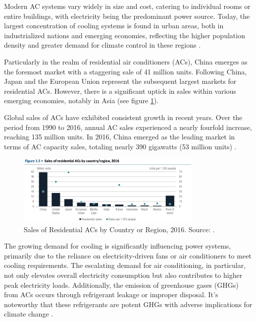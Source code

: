 Modern AC systems vary widely in size and cost, catering to individual rooms or entire buildings, with electricity being the predominant power source. Today, the largest concentration of cooling systems is found in urban areas, both in industrialized nations and emerging economies, reflecting the higher population density and greater demand for climate control in these regions \cite{international_energy_agency_future_2018}. 

Particularly in the realm of residential air conditioners (ACs), China emerges as the foremost market with a staggering sale of 41 million units. Following China, Japan and the European Union represent the subsequent largest markets for residential ACs. However, there is a significant uptick in sales within various emerging economies, notably in Asia (see figure \ref{fig:sales_acs}).

Global sales of ACs have exhibited consistent growth in recent years. Over the period from 1990 to 2016, annual AC sales experienced a nearly fourfold increase, reaching 135 million units. In 2016, China emerged as the leading market in terms of AC capacity sales, totaling nearly 390 gigawatts (53 million units) \cite{international_energy_agency_future_2018}.

\begin{figure}
  \centering
  \includegraphics[width=0.8\textwidth]{Chapters/Figures/Sales of Residential ACs by Country or Region, 2016.jpg}
  \caption[Sales of Residential ACs by Country or Region, 2016]{Sales of Residential ACs by Country or Region, 2016. Source: \cite{international_energy_agency_future_2018}.}
  \label{fig:sales_acs}
\end{figure}

The growing demand for cooling is significantly influencing power systems, primarily due to the reliance on electricity-driven fans or air conditioners to meet cooling requirements. The escalating demand for air conditioning, in particular, not only elevates overall electricity consumption but also contributes to higher peak electricity loads. Additionally, the emission of greenhouse gases (GHGs) from ACs occurs through refrigerant leakage or improper disposal. It's noteworthy that these refrigerants are potent GHGs with adverse implications for climate change \cite{international_energy_agency_future_2018}. %

